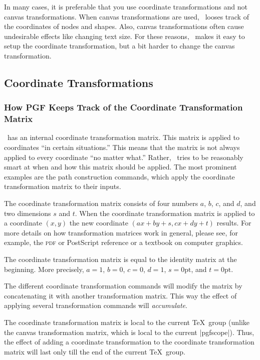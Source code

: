 In many cases, it is preferable that you use coordinate
transformations and not canvas transformations. When canvas
transformations are used, \pgfname\ looses track of the coordinates of
nodes and shapes. Also, canvas transformations often cause undesirable
effects like changing text size. For these reasons, \pgfname\ makes it
easy to setup the coordinate transformation, but a bit harder to
change the canvas transformation.


\subsection{Coordinate Transformations}

\subsubsection{How PGF Keeps Track of the Coordinate Transformation
  Matrix}

\pgfname\ has an internal coordinate transformation matrix. This
matrix is applied to coordinates ``in certain situations.'' This means
that the matrix is not always applied to every coordinate ``no matter
what.'' Rather, \pgfname\ tries to be reasonably smart at when and how
this matrix should be applied. The most prominent examples are the
path construction commands, which apply the coordinate transformation
matrix to their inputs.

The coordinate transformation matrix consists of four numbers $a$,
$b$, $c$, and $d$, and two dimensions $s$ and $t$. When the coordinate
transformation matrix is applied to a coordinate $(x,y)$ the new
coordinate $(ax+by+s,cx+dy+t)$ results. For more details on how
transformation matrices work in general, please see, for example, the
\textsc{pdf} or PostScript reference or a textbook on computer
graphics.

The coordinate transformation matrix is equal to the identity matrix
at the beginning. More precisely, $a=1$, $b=0$, $c=0$, $d=1$,
$s=0\mathrm{pt}$, and $t=0\mathrm{pt}$.

The different coordinate transformation commands will modify the
matrix by concatenating it with another transformation matrix. This
way the effect of applying several transformation commands will
\emph{accumulate}.

The coordinate transformation matrix is local to the current \TeX\
group (unlike the canvas transformation matrix, which is local to the
current |{pgfscope}|). Thus, the effect of adding a coordinate
transformation to the coordinate transformation matrix will last only
till the end of the current \TeX\ group.




